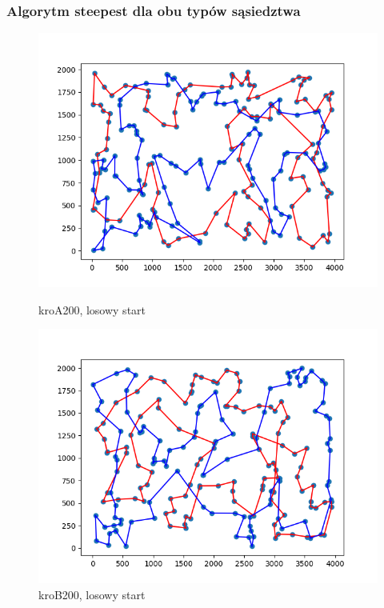 \documentclass[11pt]{article}
\begin{document}
\subsubsection{Algorytm steepest dla obu typów sąsiedztwa}
\begin{figure}[H]
    \centering
    \begin{minipage}[t]{0.45\textwidth}
        \centering
        \includegraphics[width=\linewidth]{best_paths/kroA200/traverse_steepest_both/randomstart.png}
        \caption{kroA200, losowy start}
    \end{minipage}
    \hfill
    \begin{minipage}[t]{0.45\textwidth}
        \centering
        \includegraphics[width=\linewidth]{best_paths/kroB200/traverse_steepest_both/randomstart.png}
        \caption{kroB200, losowy start}
    \end{minipage}


\end{figure}
\end{document}
